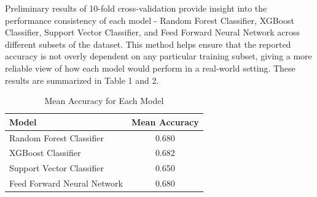 \documentclass[12pt]{extarticle}
\begin{document}
    Preliminary results of 10-fold cross-validation provide insight into the performance consistency of each model - Random Forest Classifier, XGBoost Classifier, Support Vector Classifier, and Feed Forward Neural Network across different subsets of the dataset. 
    This method helps ensure that the reported accuracy is not overly dependent on any particular training subset, giving a more reliable view of how each model would perform in a real-world setting. 
    These results are summarized in Table 1 and 2.

    \begin{table}[h!]
        \centering
        \caption{10-Fold Cross-Validation Results for Each Model}
        \label{table:10foldcv-results}
    \end{table}

    \begin{table}[h!]
        \centering
        \begin{tabular}{|l|c|}
            \hline
            \textbf{Model} & \textbf{Mean Accuracy} \\
            \hline
            Random Forest Classifier & 0.680 \\
            \hline
            XGBoost Classifier & 0.682 \\
            \hline
            Support Vector Classifier & 0.650 \\
            \hline
            Feed Forward Neural Network & 0.680 \\
            \hline
        \end{tabular}
        \caption{Mean Accuracy for Each Model}
        \label{'table:mean_accuracy_table'}
    \end{table}
\end{document}

